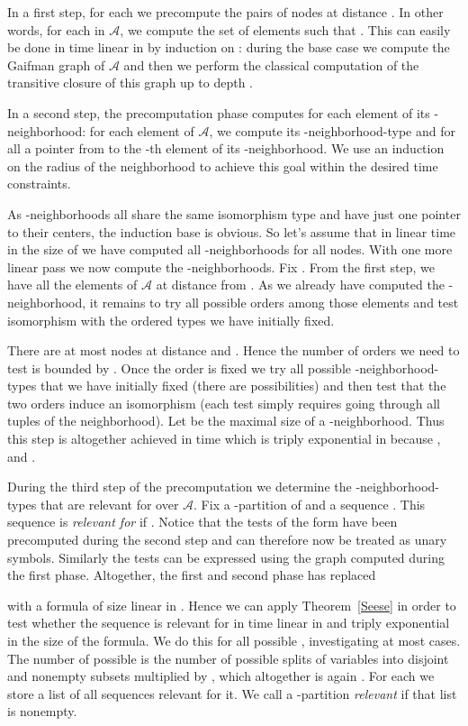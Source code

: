 \documentclass{LMCS}
\newcommand\cA{\ensuremath{{\mathcal A}}\xspace}
\begin{document}
  In a first step, for each  we precompute the pairs of nodes at
  distance . In other words, for each  in \cA, we compute the set of
  elements  such that . This can easily be done in time
  linear in  by induction on : during the base case we compute
  the Gaifman graph of \cA and then we perform the classical computation of
  the transitive closure of this graph up to depth .

  In a second step, the precomputation phase computes for each element  of
   its -neighborhood: for each element  of \cA, we compute its
  -neighborhood-type and for all  a pointer from  to the -th
  element of its -neighborhood. We use an induction on the radius of the
  neighborhood to achieve this goal within the desired time constraints.
  
  As -neighborhoods all share the same isomorphism type and have just one
  pointer to their centers, the induction base is obvious. So let's assume that
  in linear time in the size of  we have computed all -neighborhoods
  for all nodes.  With one more linear pass we now compute the
  -neighborhoods. Fix . From the first step, we have all
  the elements of \cA at distance  from . As we already have computed
  the -neighborhood, it remains to try all possible orders among those
  elements and test isomorphism with the ordered types we have initially fixed.

  There are at most  nodes at distance  and . Hence the
  number of orders we need to test is bounded by . Once the order is
  fixed we try all possible -neighborhood-types that we have initially
  fixed (there are  possibilities) and then test that the two orders
  induce an isomorphism (each test simply requires going through all tuples of
  the neighborhood). Let  be the maximal size of a
  -neighborhood. Thus this step is altogether achieved in time
   which is triply exponential in 
  because ,  and .

  During the third step of the precomputation we determine the
  -neighborhood-types that are relevant for  over \cA. Fix a -partition
   of  and a sequence
  . This sequence is
  \emph{relevant for } if . Notice that the tests of the form
   have been precomputed during the second step and
  can therefore now be treated as unary symbols. Similarly the tests
   can be expressed using the graph computed during the
  first phase. Altogether, the first and second phase has replaced
  
  with a formula of size linear in . Hence
  we can apply Theorem~\ref{Seese} in order to test whether the sequence is
  relevant for  in time linear in  and triply exponential in the size of
  the formula.  We do this for all possible , investigating at most
   cases. The number of possible  is
  the number of possible splits of  variables into disjoint and nonempty subsets
  multiplied by , which altogether is again .
  For each  we store a list of all sequences relevant for it. We call a -partition
   \emph{relevant} if that list is nonempty.
\end{document}
